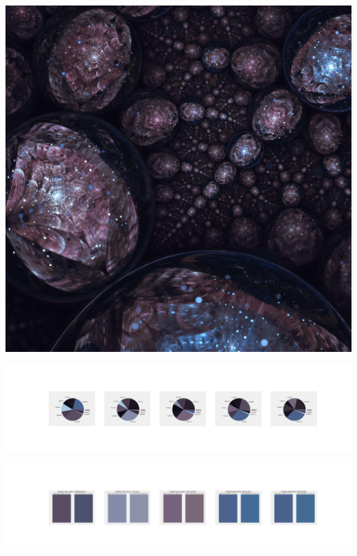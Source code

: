 \documentclass[11pt]{article}
\begin{document}
\begin{landscape}
    \begin{center}
    \includegraphics[width=\textwidth]{./nbimg/file (351).jpg}
    \end{center}

    \begin{center}
    \includegraphics[width=250mm]{./nbimg/pie-280.jpg}
    \end{center}

    \begin{center}
    \includegraphics[width=250mm]{./nbimg/peak-280.jpg}
    \end{center}
    


\end{landscape}
\end{document}
